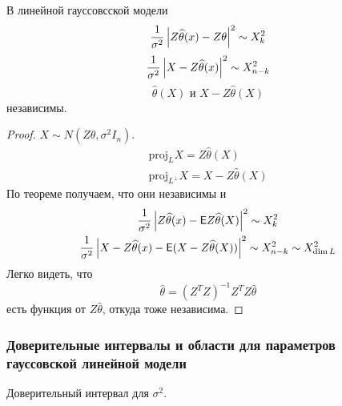 \begin{remark}
    В линейной гауссовсской модели
    \begin{displaymath}
        \frac{1}{\sigma^2} \left|Z \widehat{\theta}(x ) - Z \theta\right|^2 \sim X^2_k
    \end{displaymath}
    \begin{displaymath}
        \frac{1}{\sigma^2} \left|X - Z \widehat{\theta}(x)\right|^2 \sim X^2_{n - k}
    \end{displaymath}
    \begin{displaymath}
        \widehat{\theta}(X) \text{ и } X - Z \widehat{\theta}(X)
    \end{displaymath}
    независимы.
\end{remark}
\begin{proof}
    \(X \sim N(Z \theta, \sigma^2 I_n)\).
    \begin{gather*}
        \mathrm{proj}_L X = Z \widehat{\theta} (X) \\
        \mathrm{proj}_{L ^ \perp} X = X - Z \widehat{\theta} (X)
    \end{gather*}
    По теореме получаем, что они независимы и 
    \begin{gather*}
        \frac{1}{\sigma^2} \abs{Z \widehat{\theta}(x ) - \EE Z \widehat{\theta}(X)}^2 \sim X^2_k \\
        \frac{1}{\sigma^2} \abs{X - Z \widehat{\theta}(x) - \EE(X - Z \widehat\theta(X))}^2 \sim X^2_{n - k} \sim X^2 _{\dim L} \\
    \end{gather*}
    Легко видеть, что
    \begin{displaymath}
        \widehat{\theta} = (Z^T Z)^{-1} Z^T Z \widehat{\theta}
    \end{displaymath}
    есть функция от \(Z \widehat{\theta}\), откуда тоже независима.
\end{proof}

\subsubsection{Доверительные интервалы и области для параметров гауссовской линейной модели}

Доверительный интервал для \(\sigma^2\).

